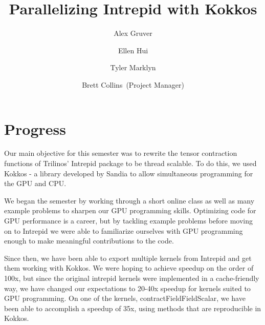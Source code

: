 \documentclass[midyear]{hmcclinic}
\title{Parallelizing Intrepid with Kokkos}
\author{Alex Gruver \and Ellen Hui \and Tyler Marklyn \and Brett Collins~(Project Manager)}
\begin{document}





\maketitle

\mainmatter




\section*{Progress}
Our main objective for this semester was to rewrite the tensor contraction
functions of Trilinos' Intrepid package to be thread scalable. To do this, we used
Kokkos - a library developed by Sandia to allow simultaneous programming for the
GPU and CPU. 

We began the semester by working through a short online class as well as many
example problems to sharpen our GPU programming skills. Optimizing code for GPU
performance is a career, but by tackling example problems before moving on to
Intrepid we were able to familiarize ourselves with GPU programming enough to
make meaningful contributions to the code.

Since then, we have been able to export multiple kernels from Intrepid and get
them working with Kokkos. We were hoping to achieve speedup on the order of
100x, but since the original intrepid kernels were implemented in a
cache-friendly way, we have changed our expectations to 20-40x speedup for
kernels suited to GPU programming.  On one of the kernels,
contractFieldFieldScalar, we have been able to accomplish a speedup of 35x,
using methods that are reproducible in Kokkos. 
\end{document}
